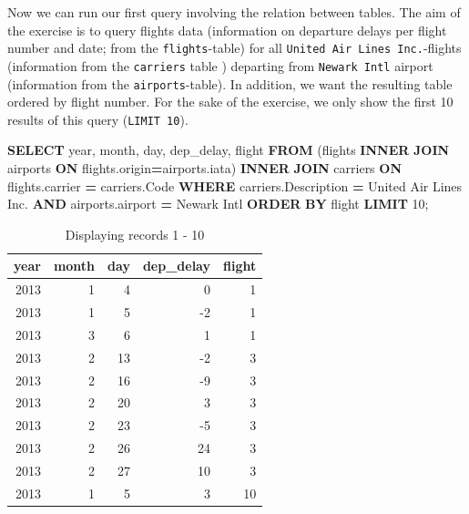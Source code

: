 \documentclass[
  12pt,
]{style/krantz}
\newenvironment{Shaded}{\begin{snugshade}}{\end{snugshade}}
\newcommand{\DataTypeTok}[1]{\textcolor[rgb]{0.13,0.29,0.53}{#1}}
\newcommand{\DecValTok}[1]{\textcolor[rgb]{0.00,0.00,0.81}{#1}}
\newcommand{\KeywordTok}[1]{\textcolor[rgb]{0.13,0.29,0.53}{\textbf{#1}}}
\newcommand{\NormalTok}[1]{#1}
\newcommand{\OperatorTok}[1]{\textcolor[rgb]{0.81,0.36,0.00}{\textbf{#1}}}
\newcommand{\StringTok}[1]{\textcolor[rgb]{0.31,0.60,0.02}{#1}}
\begin{document}
Now we can run our first query involving the relation between tables. The aim of the exercise is to query flights data (information on departure delays per flight number and date; from the \texttt{flights}-table) for all \texttt{United\ Air\ Lines\ Inc.}-flights (information from the \texttt{carriers} table ) departing from \texttt{Newark\ Intl} airport (information from the \texttt{airports}-table). In addition, we want the resulting table ordered by flight number. For the sake of the exercise, we only show the first 10 results of this query (\texttt{LIMIT\ 10}).

\begin{Shaded}
\begin{Highlighting}[]
\KeywordTok{SELECT} 
\DataTypeTok{year}\NormalTok{,}
\DataTypeTok{month}\NormalTok{, }
\DataTypeTok{day}\NormalTok{,}
\NormalTok{dep\_delay,}
\NormalTok{flight}
\KeywordTok{FROM}\NormalTok{ (flights }\KeywordTok{INNER} \KeywordTok{JOIN}\NormalTok{ airports }\KeywordTok{ON}\NormalTok{ flights.origin}\OperatorTok{=}\NormalTok{airports.iata) }
\KeywordTok{INNER} \KeywordTok{JOIN}\NormalTok{ carriers }\KeywordTok{ON}\NormalTok{ flights.carrier }\OperatorTok{=}\NormalTok{ carriers.Code}
\KeywordTok{WHERE}\NormalTok{ carriers.Description }\OperatorTok{=} \StringTok{\textquotesingle{}United Air Lines Inc.\textquotesingle{}}
\KeywordTok{AND}\NormalTok{ airports.airport }\OperatorTok{=} \StringTok{\textquotesingle{}Newark Intl\textquotesingle{}}
\KeywordTok{ORDER} \KeywordTok{BY}\NormalTok{ flight}
\KeywordTok{LIMIT} \DecValTok{10}\NormalTok{;}
\end{Highlighting}
\end{Shaded}

\begin{table}

\caption{\label{tab:unnamed-chunk-126}Displaying records 1 - 10}
\centering
\begin{tabular}[t]{r|r|r|r|r}
\hline
year & month & day & dep\_delay & flight\\
\hline
2013 & 1 & 4 & 0 & 1\\
\hline
2013 & 1 & 5 & -2 & 1\\
\hline
2013 & 3 & 6 & 1 & 1\\
\hline
2013 & 2 & 13 & -2 & 3\\
\hline
2013 & 2 & 16 & -9 & 3\\
\hline
2013 & 2 & 20 & 3 & 3\\
\hline
2013 & 2 & 23 & -5 & 3\\
\hline
2013 & 2 & 26 & 24 & 3\\
\hline
2013 & 2 & 27 & 10 & 3\\
\hline
2013 & 1 & 5 & 3 & 10\\
\hline
\end{tabular}
\end{table}
\end{document}
